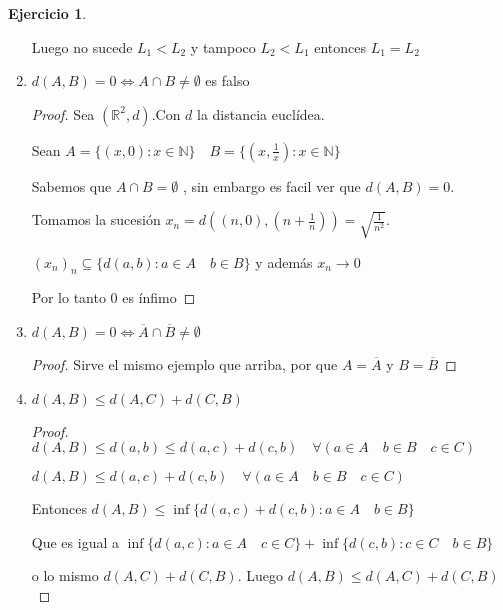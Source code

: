 \documentclass[12pt]{report}
\newcommand{\R}{\mathbb{R}}
\newcommand{\N}{\mathbb{N}}
\newcommand{\ra}{\rightarrow}
\newcommand{\ol}{\overline}
\theoremstyle{definition}
\newtheorem{ej}{Ejercicio}
\begin{document}
\begin{ej}
\begin{enumerate}
Luego no sucede $L_1 < L_2 $ y tampoco $L_2 < L_1$ entonces $L_1 = L_2$
    \item $d(A,B) = 0 \iff A \cap B \neq \emptyset$ es falso
      \begin{proof}
	Sea $(\R^2,d)$.Con $d$ la distancia euclídea. 

	Sean $A = \{(x,0): x \in \N\} \quad B= \{(x,\frac{1}{x}): x \in \N \}$ 

	Sabemos que $A \cap B = \emptyset$ , sin embargo es facil ver que $d(A,B) = 0$. 

	Tomamos la sucesión $x_n = d((n,0), (n + \frac{1}{n})) = \sqrt{\frac{1}{n^2}}$. 
	
	$(x_n)_n \subseteq \{d(a,b) : a\in A \quad b \in B\}$ y además $x_n \ra 0$

	Por lo tanto $0$ es ínfimo

      \end{proof}
    \item $d(A,B) = 0 \iff \ol A \cap \ol B \neq \emptyset$
      \begin{proof}
	Sirve el mismo ejemplo que arriba, por que $A = \ol A$ y $B = \ol B$
      \end{proof}
    \item $d(A,B) \leq d(A,C) + d(C,B)$
      \begin{proof}
	$d(A,B)  \leq d(a,b) \leq d(a,c) + d(c,b) \quad \forall (a \in A \quad b \in B \quad c \in C)$

      $d(A,B) \leq d(a,c) + d(c,b) \quad \forall (a \in A \quad b \in B \quad c \in C)$ 

      Entonces $d(A,B) \leq \inf \{d(a,c) + d(c,b) : a \in A \quad b \in B\}$

      Que es igual a  $ \inf \{d(a,c) :  a \in A \quad c \in C\} + \inf \{d(c,b): c \in C \quad b \in B\}$

      o lo mismo $d(A,C) + d(C,B)$. Luego $d(A,B) \leq d(A,C) + d(C,B)$
      \end{proof}
  \end{enumerate}
\end{ej}
\end{document}

